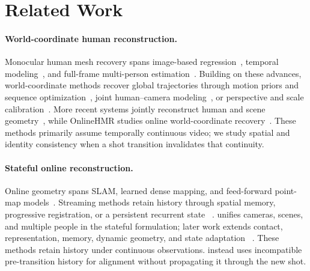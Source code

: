 \section{Related Work}

\paragraph{World-coordinate human reconstruction.}
Monocular human mesh recovery spans image-based
regression~\citep{kanazawa2018hmr}, temporal
modeling~\citep{kocabas2020vibe,goel2023humans4d}, and full-frame multi-person
estimation~\citep{sun2021romp,sun2022bev,sun2023trace,baradel2024multihmr,wang2025prompthmr,sun2024aios}.
Building on these advances, world-coordinate methods recover global trajectories
through motion priors and sequence
optimization~\citep{yuan2022glamr,ye2023slahmr,kocabas2024pace,li2024coin},
joint human--camera modeling~\citep{wang2024tram,shin2024wham,shen2024gvhmr,yin2024whac},
or perspective and scale calibration~\citep{patel2025camerahmr,yang2025checkerboards}.
More recent systems jointly reconstruct human and scene
geometry~\citep{muller2025reconstructing,liu2026josh,zhang2025odhsr,li2026unish},
while OnlineHMR studies online world-coordinate
recovery~\citep{zhao2026onlinehmr}. These methods primarily
assume temporally continuous video; we study spatial and identity consistency
when a shot transition invalidates that continuity.

\paragraph{Stateful online reconstruction.}
Online geometry spans SLAM, learned dense mapping, and feed-forward point-map
models~\citep{teed2021droidslam,sun2021neuralrecon,wang2024dust3r,leroy2024mast3r,zhang2025monst3r,wang2025vggt}.
Streaming methods retain history through spatial memory, progressive
registration, or a persistent recurrent state
~\citep{wang2025spann3r,liu2025slam3r,wang2025cut3r}. \humanthree{} unifies
cameras, scenes, and multiple people in the stateful formulation; later work
extends contact, representation, memory, dynamic geometry, and state adaptation
~\citep{chen2026human3r,sur2026unicon3r,abe2026gush3r,chen2025long3r,wu2025point3r,zhuo2025st4r,chen2026ttt3r,zheng2026ttsa3r,li2026recal3r}.
These methods retain history under continuous observations. \method{} instead
uses incompatible pre-transition history for alignment without propagating it
through the new shot.

